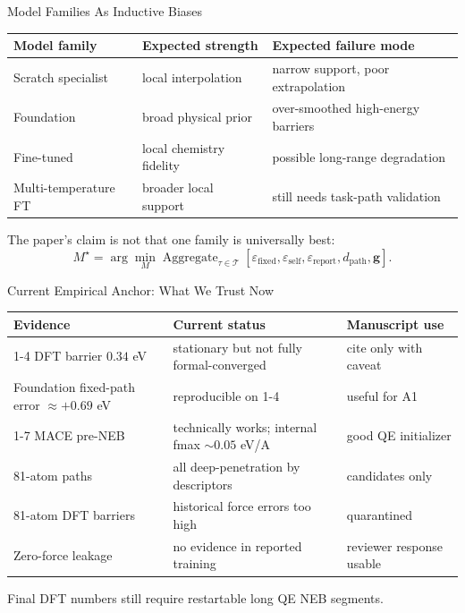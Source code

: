 \documentclass[aspectratio=169,10pt]{beamer}
\newcommand{\epsfixed}{\varepsilon_{\mathrm{fixed}}}
\newcommand{\epsself}{\varepsilon_{\mathrm{self}}}
\newcommand{\epsreport}{\varepsilon_{\mathrm{report}}}
\newcommand{\dpath}{d_{\mathrm{path}}}
\begin{document}
\begin{frame}{Model Families As Inductive Biases}
  \begin{table}
  \centering
  \small
  \begin{tabular}{lll}
  \toprule
  Model family & Expected strength & Expected failure mode \\
  \midrule
  Scratch specialist & local interpolation & narrow support, poor extrapolation \\
  Foundation & broad physical prior & over-smoothed high-energy barriers \\
  Fine-tuned & local chemistry fidelity & possible long-range degradation \\
  Multi-temperature FT & broader local support & still needs task-path validation \\
  \bottomrule
  \end{tabular}
  \end{table}

  \vspace{0.25cm}
  The paper's claim is not that one family is universally best:
  \[
  M^\star
  =
  \arg\min_M
  \operatorname{Aggregate}_{\tau\in\mathcal{T}}
  \left[
  \epsfixed,\epsself,\epsreport,\dpath,\bm{g}
  \right].
  \]
\end{frame}

\begin{frame}{Current Empirical Anchor: What We Trust Now}
  \begin{table}
  \centering
  \small
  \begin{tabular}{lll}
  \toprule
  Evidence & Current status & Manuscript use \\
  \midrule
  1-4 DFT barrier $0.34$ eV & stationary but not fully formal-converged & cite only with caveat \\
  Foundation fixed-path error $\approx +0.69$ eV & reproducible on 1-4 & useful for A1 \\
  1-7 MACE pre-NEB & technically works; internal fmax $\sim 0.05$ eV/A & good QE initializer \\
  81-atom paths & all deep-penetration by descriptors & candidates only \\
  81-atom DFT barriers & historical force errors too high & quarantined \\
  Zero-force leakage & no evidence in reported training & reviewer response usable \\
  \bottomrule
  \end{tabular}
  \end{table}

  \vspace{0.2cm}
  Final DFT numbers still require restartable long QE NEB segments.
\end{frame}
\end{document}
